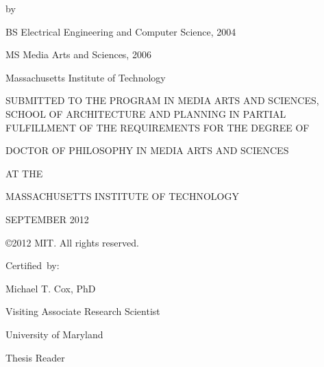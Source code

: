 \thispagestyle{empty}

\cleardoublepage

\begin{addmargin}[1cm]{-2cm}
\begin{center}
    \begingroup
        \color{Maroon}\spacedallcaps{\myTitle}
    \endgroup

    \vspace{2mm}

    by

    \vspace{2mm}

    \myName

    \vspace{6mm}
    
    BS Electrical Engineering and Computer Science, 2004
    
    MS Media Arts and Sciences, 2006

    Massachusetts Institute of Technology
    
    \vspace{6mm}

 SUBMITTED TO THE PROGRAM IN MEDIA ARTS AND SCIENCES, SCHOOL OF
 ARCHITECTURE AND PLANNING IN PARTIAL FULFILLMENT OF THE REQUIREMENTS
 FOR THE DEGREE OF

    \vspace{6mm}

DOCTOR OF PHILOSOPHY IN MEDIA ARTS AND SCIENCES

AT THE

MASSACHUSETTS INSTITUTE OF TECHNOLOGY

    \vspace{6mm}

SEPTEMBER 2012

    \vspace{6mm}

\copyright 2012 MIT.  All rights reserved.

\end{center}        


\begin{flushright}
  \vspace{15mm}

  Certified~by:\hspace{0.5cm}~\makebox[2.75in]{\hrulefill}

Michael T. Cox, PhD

Visiting Associate Research Scientist
                                 
University of Maryland

Thesis Reader

\end{flushright}

\end{addmargin}
